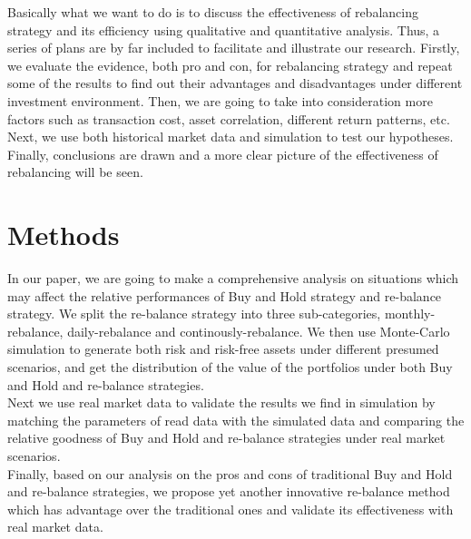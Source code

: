 \documentclass[
10pt, %
a4paper, %
oneside, %
headinclude,footinclude, %
BCOR5mm, %
]{scrartcl}
\begin{document}
Basically what we want to do is to discuss the effectiveness of rebalancing strategy and its efficiency using qualitative and quantitative analysis. Thus, a series of plans are by far included to facilitate and illustrate our research. Firstly, we evaluate the evidence, both pro and con, for rebalancing strategy and repeat some of the results to find out their advantages and disadvantages under different investment environment. Then, we are going to take into consideration more factors such as transaction cost, asset correlation, different return patterns, etc. Next, we use both historical market data and simulation to test our hypotheses. Finally, conclusions are drawn and a more clear picture of the effectiveness of rebalancing will be seen.
 

     
 

\section{Methods}
In our paper, we are going to make a comprehensive analysis on situations which may affect the relative performances of Buy and Hold strategy and re-balance strategy. We split the re-balance strategy into three sub-categories, monthly-rebalance, daily-rebalance and continously-rebalance. We then use Monte-Carlo simulation to generate both risk and risk-free assets under different presumed scenarios, and get the distribution of the value of the portfolios under both Buy and Hold and re-balance strategies.\\
Next we use real market data to validate the results we find in simulation by matching the parameters of read data with the simulated data and comparing the relative goodness of Buy and Hold and re-balance strategies under real market scenarios.\\
Finally, based on our analysis on the pros and cons of traditional Buy and Hold and re-balance strategies, we propose yet another innovative re-balance method which has advantage over the traditional ones and validate its effectiveness with real market data.
\end{document}
